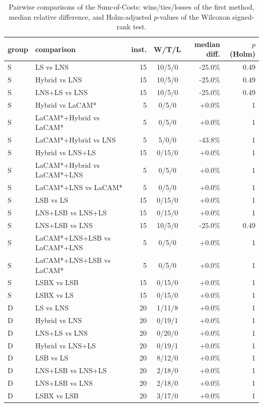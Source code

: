 \begin{table}[t]
\centering\small
\caption{Pairwise comparisons of the Sum-of-Costs: wins/ties/losses of the first method, median relative difference, and Holm-adjusted $p$-values of the Wilcoxon signed-rank test.}
\label{tab:pairs}
\begin{tabular}{llrcrr}
\toprule
group & comparison & inst. & W/T/L & median diff. & $p$ (Holm)\\
\midrule
S & LS vs LNS & 15 & 10/5/0 & -25.0\% & 0.49\\
S & Hybrid vs LNS & 15 & 10/5/0 & -25.0\% & 0.49\\
S & LNS+LS vs LNS & 15 & 10/5/0 & -25.0\% & 0.49\\
S & Hybrid vs LaCAM* & 5 & 0/5/0 & +0.0\% & 1\\
S & LaCAM*+Hybrid vs LaCAM* & 5 & 0/5/0 & +0.0\% & 1\\
S & LaCAM*+Hybrid vs LNS & 5 & 5/0/0 & -43.8\% & 1\\
S & Hybrid vs LNS+LS & 15 & 0/15/0 & +0.0\% & 1\\
S & LaCAM*+Hybrid vs LaCAM*+LNS & 5 & 0/5/0 & +0.0\% & 1\\
S & LaCAM*+LNS vs LaCAM* & 5 & 0/5/0 & +0.0\% & 1\\
S & LSB vs LS & 15 & 0/15/0 & +0.0\% & 1\\
S & LNS+LSB vs LNS+LS & 15 & 0/15/0 & +0.0\% & 1\\
S & LNS+LSB vs LNS & 15 & 10/5/0 & -25.0\% & 0.49\\
S & LaCAM*+LNS+LSB vs LaCAM*+LNS & 5 & 0/5/0 & +0.0\% & 1\\
S & LaCAM*+LNS+LSB vs LaCAM* & 5 & 0/5/0 & +0.0\% & 1\\
S & LSBX vs LSB & 15 & 0/15/0 & +0.0\% & 1\\
S & LSBX vs LS & 15 & 0/15/0 & +0.0\% & 1\\
D & LS vs LNS & 20 & 1/11/8 & +0.0\% & 1\\
D & Hybrid vs LNS & 20 & 0/19/1 & +0.0\% & 1\\
D & LNS+LS vs LNS & 20 & 0/20/0 & +0.0\% & 1\\
D & Hybrid vs LNS+LS & 20 & 0/19/1 & +0.0\% & 1\\
D & LSB vs LS & 20 & 8/12/0 & +0.0\% & 1\\
D & LNS+LSB vs LNS+LS & 20 & 2/18/0 & +0.0\% & 1\\
D & LNS+LSB vs LNS & 20 & 2/18/0 & +0.0\% & 1\\
D & LSBX vs LSB & 20 & 3/17/0 & +0.0\% & 1\\

\end{tabular}
\end{table}
